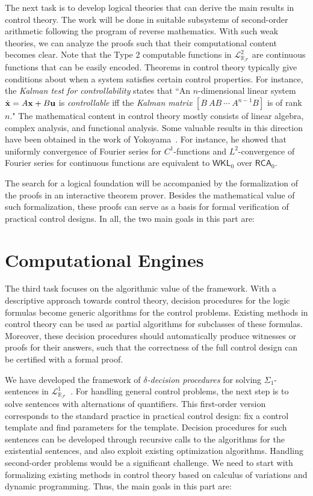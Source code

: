 \documentclass[10pt]{article}
\newcommand{\lrf}{\mathcal{L}_{\mathbb{R}_{\mathcal{F}}}}
\theoremstyle{definition}
\begin{document}
The next task is to develop logical theories that can derive the main results in control theory.
The work will be done in suitable subsystems of second-order arithmetic following the program of reverse mathematics. With such weak theories, we can analyze the proofs such that their computational content becomes clear. Note that the Type 2 computable functions in  $\lrf^2$ are continuous functions that can be easily encoded. Theorems in control theory typically give conditions about when a system satisfies certain control properties. For instance, the {\em Kalman test for controllability} states that ``An $n$-dimensional linear system $\dot {\bf x} = A{\bf x}+B{\bf u}$ is {\em controllable} iff the {\em Kalman matrix}
$[B\ AB\ \cdots\ A^{n-1}B]$ is of rank $n$." The mathematical content in control theory mostly consists of linear algebra, complex analysis, and functional analysis. Some valuable results in this direction have been obtained in the work of Yokoyama~\cite{yoko}. For instance, he showed that uniformly convergence of Fourier series for $C^1$-functions and $L^2$-convergence of Fourier series for continuous functions are equivalent to $\mathsf{WKL}_0$ over $\mathsf{RCA}_0$. 

The search for a logical foundation will be accompanied by the formalization of the proofs in an interactive theorem prover. Besides the mathematical value of such formalization, these proofs can serve as a basis for formal verification of practical control designs. In all, the two main goals in this part are:


\section{Computational Engines}


The third task focuses on the algorithmic value of the framework. With a descriptive approach towards control theory, decision procedures for the logic formulas become generic algorithms for the control problems. Existing methods in control theory can be used as partial algorithms for subclasses of these formulas. Moreover, these decision procedures should automatically produce witnesses or proofs for their answers, such that the correctness of the full control design can be certified with a formal proof.

We have developed the framework of {\em $\delta$-decision procedures} for solving $\Sigma_1$-sentences in $\lrf^1$~\cite{DBLP:conf/cade/GaoAC12}. For handling general control problems, the next step is to solve sentences with alternations of quantifiers. This first-order version corresponds to the standard practice in practical control design: fix a control template and find parameters for the template. Decision procedures for such sentences can be developed through recursive calls to the algorithms for the existential sentences, and also exploit existing optimization algorithms. Handling second-order problems would be a significant challenge. We need to start with formalizing existing methods in control theory based on calculus of variations and dynamic programming. Thus, the main goals in this part are:
\end{document}
